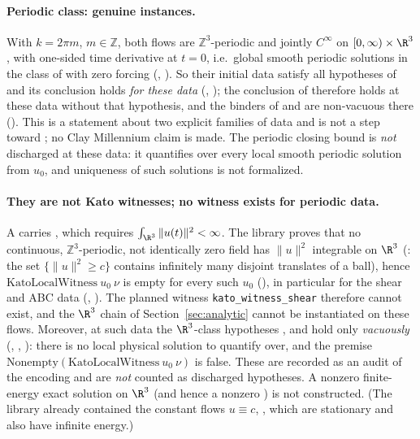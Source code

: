 \paragraph{Periodic class: genuine instances.} With $k=2\pi m$, $m\in\mathbb Z$, both flows are $\mathbb Z^3$-periodic
and jointly $C^\infty$ on $[0,\infty)\times\R^3$, with one-sided time derivative at $t=0$, i.e.\ global smooth
periodic solutions in the class  of  with zero forcing
(, ). So their initial data
satisfy all hypotheses of  and its conclusion holds \emph{for these data}
(, ); the conclusion of 
therefore holds at these data without that hypothesis, and the binders of  and
 are non-vacuous there (). This is a
statement about two explicit families of data and is not a step toward ; no Clay Millennium
claim is made. The periodic closing bound  is \emph{not} discharged at these data:
it quantifies over every local smooth periodic solution from $u_0$, and uniqueness of such solutions is not
formalized.

\paragraph{They are not Kato witnesses; no witness exists for periodic data.} A  carries
, which requires $\int_{\R^3}\|u(t)\|^2<\infty$. The library proves that no continuous,
$\mathbb Z^3$-periodic, not identically zero field has $\|u\|^2$ integrable on $\R^3$
(: the set $\{\|u\|^2\ge c\}$ contains infinitely many disjoint translates of a
ball), hence $\mathrm{KatoLocalWitness}\ u_0\ \nu$ is empty for every such $u_0$
(), in particular for the shear and ABC data
(, ). The planned witness
\texttt{kato\_witness\_shear} therefore cannot exist, and the $\R^3$ chain of Section~\ref{sec:analytic} cannot be
instantiated on these flows. Moreover, at such data the $\R^3$-class hypotheses ,
 and  hold only \emph{vacuously}
(, ,
): there is no local physical solution to quantify over, and the
premise $\mathrm{Nonempty}(\mathrm{KatoLocalWitness}\ u_0\ \nu)$ is false. These are recorded as an audit of the
encoding and are \emph{not} counted as discharged hypotheses. A nonzero finite-energy exact solution on $\R^3$ (and
hence a nonzero ) is not constructed. (The library already contained the constant flows
$u\equiv c$, , which are stationary and also have infinite energy.)

